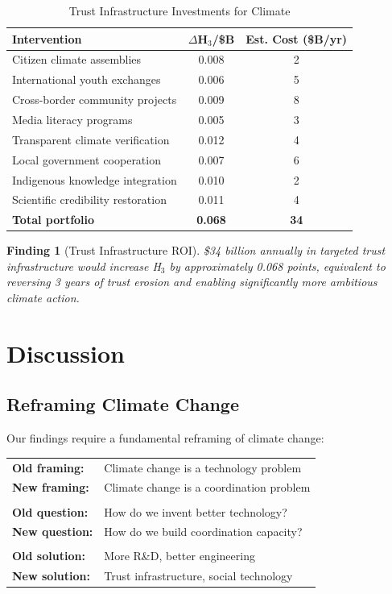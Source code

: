 \documentclass[12pt,a4paper]{article}
\newtheorem{finding}{Finding}
\begin{document}
\begin{table}[H]
\centering
\caption{Trust Infrastructure Investments for Climate}
\label{tab:trust_infrastructure}
\begin{tabular}{lcc}
\toprule
\textbf{Intervention} & \textbf{$\Delta$H$_3$/\$B} & \textbf{Est. Cost (\$B/yr)} \\
\midrule
Citizen climate assemblies & 0.008 & 2 \\
International youth exchanges & 0.006 & 5 \\
Cross-border community projects & 0.009 & 8 \\
Media literacy programs & 0.005 & 3 \\
Transparent climate verification & 0.012 & 4 \\
Local government cooperation & 0.007 & 6 \\
Indigenous knowledge integration & 0.010 & 2 \\
Scientific credibility restoration & 0.011 & 4 \\
\midrule
\textbf{Total portfolio} & \textbf{0.068} & \textbf{34} \\
\bottomrule
\end{tabular}
\end{table}

\begin{finding}[Trust Infrastructure ROI]
\$34 billion annually in targeted trust infrastructure would increase H$_3$ by approximately 0.068 points, equivalent to reversing 3 years of trust erosion and enabling significantly more ambitious climate action.
\end{finding}

\section{Discussion}
\label{sec:discussion}

\subsection{Reframing Climate Change}

Our findings require a fundamental reframing of climate change:

\begin{center}
\begin{tabular}{ll}
\textbf{Old framing:} & Climate change is a technology problem \\
\textbf{New framing:} & Climate change is a coordination problem \\
\\
\textbf{Old question:} & How do we invent better technology? \\
\textbf{New question:} & How do we build coordination capacity? \\
\\
\textbf{Old solution:} & More R\&D, better engineering \\
\textbf{New solution:} & Trust infrastructure, social technology \\
\end{tabular}
\end{center}
\end{document}
